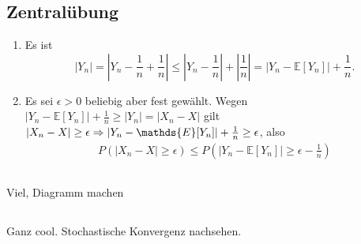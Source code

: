 \documentclass[a4paper]{article}
\begin{document}
\makeexheaderger

\subsection{Zentralübung}

\begin{enumerate}
    \item Es ist 
    \begin{equation*}
        |Y_n| = \left|Y_n - \frac{1}{n} + \frac{1}{n}\right| \leq \left| Y_n - \frac{1}{n} \right| + \left| \frac{1}{n} \right| = |Y_n - \mathds{E}[Y_n]| + \frac{1}{n}\text{.}
    \end{equation*}
    \item Es sei $\epsilon > 0$ beliebig aber fest gewählt. Wegen $|Y_n - \mathds{E}[Y_n]| + \frac{1}{n} \geq |Y_n| = |X_n - X|$ gilt $|X_n - X| \geq \epsilon \then |Y_n - \mathds{E}[Y_n]| + \frac{1}{n} \geq \epsilon$, also 
    \begin{align*}
        P(|X_n - X| \geq \epsilon) \leq P(|Y_n - \mathds{E}[Y_n]| \geq \epsilon - \frac{1}{n}) 
    \end{align*}
\end{enumerate}

\subsection{}

Viel, Diagramm machen

\subsection{}


\subsection{}

Ganz cool. Stochastische Konvergenz nachsehen.
\end{document}
